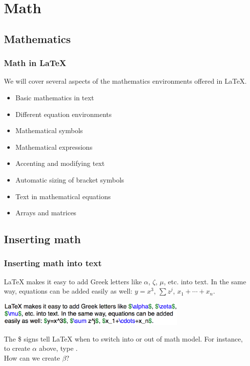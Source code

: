 

\section[Math]{Math}

\subsection[Mathematics]{Mathematics}
\begin{frame} \frametitle{Math in LaTeX}
We will cover several aspects of the mathematics environments offered in LaTeX.
\begin{itemize}
\item Basic mathematics in text
\item Different equation environments
\item Mathematical symbols
\item Mathematical expressions
\item Accenting and modifying text
\item Automatic sizing of bracket symbols
\item Text in mathematical equations
\item Arrays and matrices
\end{itemize}
\end{frame}

\subsection[Inserting math]{Inserting math}
\begin{frame} \frametitle{Inserting math into text}
LaTeX makes it easy to add Greek letters like $\alpha$, $\zeta$,
$\mu$, etc. into text. In the same way, equations can be added
easily as well: $y=x^3$, $\sum z^j$, $x_1+\cdots+x_n$.
\begin{center}
\includegraphics[height=0.47in]{math/mathInText}
\end{center}
The {\color{braces}\$} signs tell LaTeX when to switch into or out of math model. For instance, to create $\alpha$ above, type . %
\vspace{5mm} \\
How can we create $\beta$?
\end{frame}

